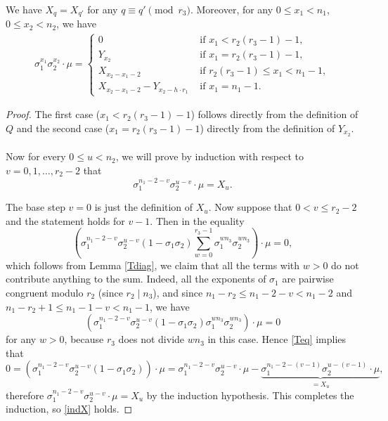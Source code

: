 \begin{lemma}\label{XY}
We have $X_q=X_{q'}$ for any $q\equiv q'\pmod {r_3}$. Moreover,
for any $0\leq x_1<n_1$, $0\leq x_2<n_2$, we have
\begin{align*}
\sigma_1^{x_1}\sigma_2^{x_2}\cdot \mu=
\begin{cases}
0   &\text{ if }  x_1<r_2(r_3-1)-1,\\
Y_{x_2} \quad &\text{ if } x_1=r_2(r_3-1)-1, \\
X_{x_2-x_1-2}  \quad &\text{ if } r_2(r_3-1)\leq x_1<n_1-1, \\
X_{x_2-x_1-2}-Y_{x_2-h\cdot r_1} &\text{ if }  x_1=n_1-1.
\end{cases}
\end{align*}
\end{lemma}
\begin{proof}

The first case ($x_1<r_2(r_3-1)-1$) follows directly from the definition of $Q$ and the second case ($x_1=r_2(r_3-1)-1$) directly from the definition of $Y_{x_2}$.

\paragraph*{}
Now for every $0\leq u <n_2$, we will prove by induction with respect to $v=0,1,\dots,r_2-2$ that 
\begin{equation}\label{indX}
\sigma_1^{n_1-2-v}\sigma_2^{u-v}\cdot \mu =X_u.
\end{equation}

The base step $v=0$ is just the definition of $X_u$. Now suppose that $0<v\leq r_2-2$ and the statement holds for $v-1$. Then in the equality
\begin{equation}\label{Teq}
\left(\sigma_1^{n_1-2-v}\sigma_2^{u-v}(1-\sigma_1\sigma_2)\sum_{w=0}^{r_3-1}\sigma_1^{wn_3}\sigma_2^{wn_3}\right)\cdot \mu=0,
\end{equation}
which follows from Lemma \ref{Tdiag}, we claim that all the terms with $w>0$ do not contribute anything to the sum. Indeed, all the exponents of $\sigma_1$ are pairwise congruent modulo $r_2$ (since $r_2\mid n_3$), and since $n_1-r_2\leq n_1-2-v<n_1-2$ and $n_1-r_2+1\leq n_1-1-v<n_1-1$, we have $$\left(\sigma_1^{n_1-2-v}\sigma_2^{u-v}(1-\sigma_1\sigma_2)\sigma_1^{wn_3}\sigma_2^{wn_3}\right)\cdot \mu=0$$ for any $w>0$, because  $r_3$ does not divide $wn_3$ in this case. Hence \eqref{Teq} implies that
$$0=\left(\sigma_1^{n_1-2-v}\sigma_2^{u-v}(1-\sigma_1\sigma_2)\right)\cdot \mu=\sigma_1^{n_1-2-v}\sigma_2^{u-v}\cdot \mu-\underbrace{\sigma_1^{n_1-2-(v-1)}\sigma_2^{u-(v-1)}\cdot \mu}_{=X_u},$$
therefore $\sigma_1^{n_1-2-v}\sigma_2^{u-v}\cdot \mu=X_u$ by the induction hypothesis. This completes the induction, so \eqref{indX} holds.


\end{proof}

